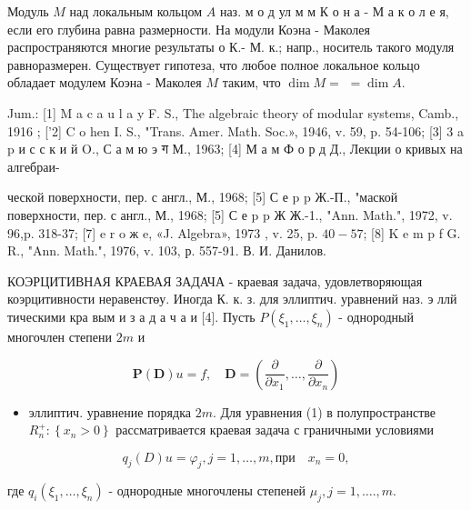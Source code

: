 \documentclass[10pt]{article}
\begin{document}
Модуль $M$ над локальным кольцом $A$ наз. м о д ул м м К о н а - $М$ а к о л е я, если его глубина равна размерности. На модули Коэна - Маколея распространяются многие результаты о К.- М. к.; напр., носитель такого модуля равноразмерен. Существует гипотеза, что любое полное локальное кольцо обладает модулем Коэна - Маколея $M$ таким, что $\operatorname{dim} M=$ $=\operatorname{dim} A$.



Jum.: [1] M a c a u l a y F. S., The algebraic theory of modular systems, Camb., 1916 ; ['2] C o hen I. S., "Trans. Amer. Math. Soc.», 1946, v. 59, p. 54-106; [3] 3 a p и с с к и й O., С а м ю э ग М., 1963; [4] М а м Ф о р д Д., Лекции о кривых на алгебраи-

ческой поверхности, пер. с англ., М., 1968; [5] С е p p Ж.-П., "маской поверхности, пер. с англ., М., 1968; [5] С е p p Ж Ж.-1., "Ann. Math.", 1972, v. 96,p. 318-37; [7] e r o ж e, «J. Algebra», 1973 , v. 25, p. $40-57$; [8] K e m p f G. R., "Ann. Math.", 1976, v. 103, р. 557-91. В. И. Данилов.



КОЭРЦИТИВНАЯ КРАЕВАЯ ЗАДАЧА - краевая задача, удовлетворяющая коэрцитивности неравенстөу. Иногда К. к. з. для эллиптич. уравнений наз. э ллй тическими кра вым и з а д а ч а и [4]. Пусть $P\left(\xi_{1}, \ldots, \xi_{n}\right)$ - однородный многочлен степени $2 m$ и



\[

\boldsymbol{P}(\boldsymbol{D}) u=f, \quad \boldsymbol{D}=\left(\frac{\partial}{\partial x_{1}}, \ldots, \frac{\partial}{\partial x_{n}}\right)

\]



\begin{itemize}

  \item эллиптич. уравнение порядка $2 m$. Для уравнения (1) в полупространстве $R_{n}^{+}:\left\{x_{n}>0\right\}$ рассматривается краевая задача с граничными условиями

\end{itemize}



\[

q_{j}(D) u=\varphi_{j}, j=1, \ldots, m, п р и \quad x_{n}=0,

\]



где $q_{i}\left(\xi_{1}, \ldots, \xi_{n}\right)$ - однородные многочлены степеней $\mu_{j}, j=1, \ldots ., m$.
\end{document}
